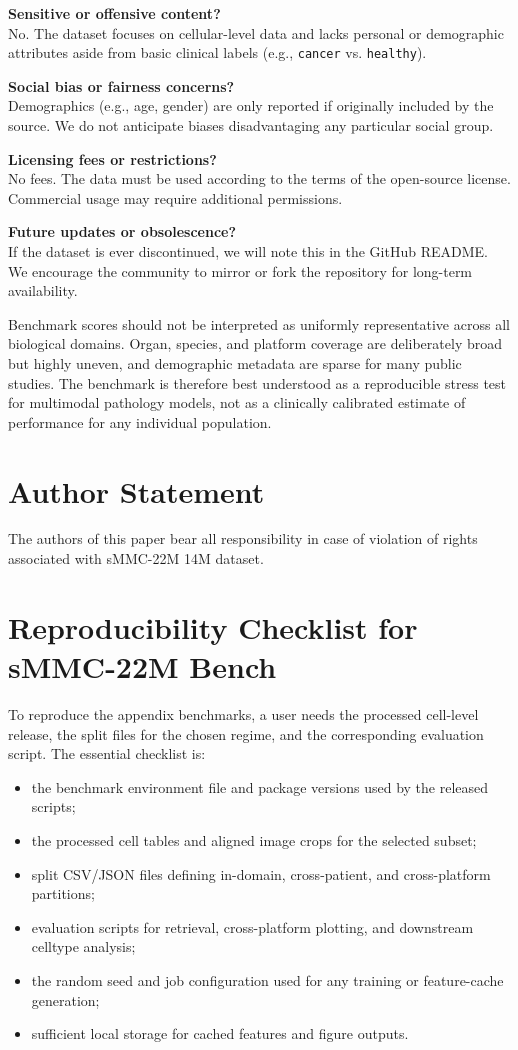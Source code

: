\documentclass{article}
\newcommand{\dataset}{sMMC-22M\xspace}
\begin{document}
\noindent
\textbf{Sensitive or offensive content?} \\
No. The dataset focuses on cellular-level data and lacks personal or demographic attributes aside from basic clinical labels (e.g., \texttt{cancer} vs. \texttt{healthy}).

\noindent
\textbf{Social bias or fairness concerns?} \\
Demographics (e.g., age, gender) are only reported if originally included by the source. We do not anticipate biases disadvantaging any particular social group.

\noindent
\textbf{Licensing fees or restrictions?} \\
No fees. The data must be used according to the terms of the open-source license. Commercial usage may require additional permissions.

\noindent
\textbf{Future updates or obsolescence?} \\
If the dataset is ever discontinued, we will note this in the GitHub README. We encourage the community to mirror or fork the repository for long-term availability.

Benchmark scores should not be interpreted as uniformly representative across all biological domains. Organ, species, and platform coverage are deliberately broad but highly uneven, and demographic metadata are sparse for many public studies. The benchmark is therefore best understood as a reproducible stress test for multimodal pathology models, not as a clinically calibrated estimate of performance for any individual population.

\section{Author Statement}
\label{sec:author_statement}
\noindent
The authors of this paper bear all responsibility in case of violation of rights associated with \dataset14M dataset.

\section{Reproducibility Checklist for \dataset Bench}
\noindent
To reproduce the appendix benchmarks, a user needs the processed cell-level release, the split files for the chosen regime, and the corresponding evaluation script. The essential checklist is:
\begin{itemize}
    \item the benchmark environment file and package versions used by the released scripts;
    \item the processed cell tables and aligned image crops for the selected subset;
    \item split CSV/JSON files defining in-domain, cross-patient, and cross-platform partitions;
    \item evaluation scripts for retrieval, cross-platform plotting, and downstream celltype analysis;
    \item the random seed and job configuration used for any training or feature-cache generation;
    \item sufficient local storage for cached features and figure outputs.
\end{itemize}
\end{document}
